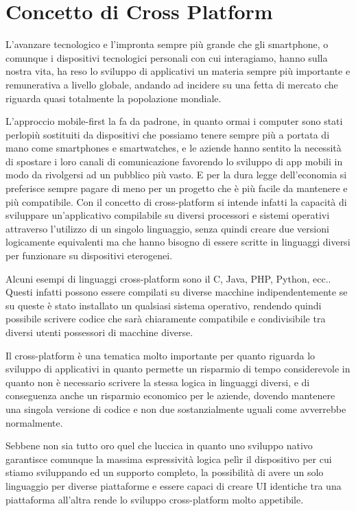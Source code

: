 \chapter{Concetto di Cross Platform}\label{ch:crossplatform}

L'avanzare tecnologico e l'impronta sempre più grande che gli smartphone, o comunque i dispositivi tecnologici personali con cui interagiamo, hanno sulla nostra vita, ha reso lo sviluppo di applicativi un materia sempre più importante e remunerativa a livello globale, andando ad incidere su una fetta di mercato che riguarda quasi totalmente la popolazione mondiale.

L'approccio mobile-first la fa da padrone, in quanto ormai i computer sono stati perlopiù sostituiti da dispositivi che possiamo tenere sempre più a portata di mano come smartphones e smartwatches, e le aziende hanno sentito la necessità di spostare i loro canali di comunicazione favorendo lo sviluppo di app mobili in modo da rivolgersi ad un pubblico più vasto. E per la dura legge dell'economia si preferisce sempre pagare di meno per un progetto che è più facile da mantenere e più compatibile.
Con il concetto di cross-platform si intende infatti la capacità di sviluppare un'applicativo compilabile su diversi processori e sistemi operativi attraverso l'utilizzo di un singolo linguaggio, senza quindi creare due versioni logicamente equivalenti ma che hanno bisogno di essere scritte in linguaggi diversi per funzionare su dispositivi eterogenei.

Alcuni esempi di linguaggi cross-platform sono il C, Java, PHP, Python, ecc.. Questi infatti possono essere compilati su diverse macchine indipendentemente se su queste è stato installato un qualsiasi sistema operativo, rendendo quindi possibile scrivere codice che sarà chiaramente compatibile e condivisibile tra diversi utenti possessori di macchine diverse.

Il cross-platform è una tematica molto importante per quanto riguarda lo sviluppo di applicativi in quanto permette un risparmio di tempo considerevole in quanto non è necessario scrivere la stessa logica in linguaggi diversi, e di conseguenza anche un risparmio economico per le aziende, dovendo mantenere una singola versione di codice e non due sostanzialmente uguali come avverrebbe normalmente.

Sebbene non sia tutto oro quel che luccica in quanto uno sviluppo nativo garantisce comunque la massima espressività logica pelìr il dispositivo per cui stiamo sviluppando ed un supporto completo, la possibilità di avere un solo linguaggio per diverse piattaforme e essere capaci di creare UI identiche tra una piattaforma all'altra rende lo sviluppo cross-platform molto appetibile.

